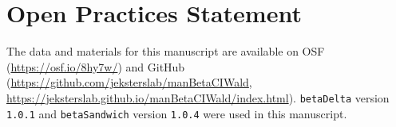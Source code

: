 \documentclass[man]{apa7}\usepackage[]{graphicx}\usepackage[]{xcolor}
\begin{document}
\section{Open Practices Statement}

The data and materials for this manuscript are available on OSF (\url{https://osf.io/8hy7w/}) and GitHub (\url{https://github.com/jeksterslab/manBetaCIWald}, \url{https://jeksterslab.github.io/manBetaCIWald/index.html}). \texttt{betaDelta} version \texttt{1.0.1} and \texttt{betaSandwich} version \texttt{1.0.4} were used in this manuscript.

\printbibliography
\end{document}
